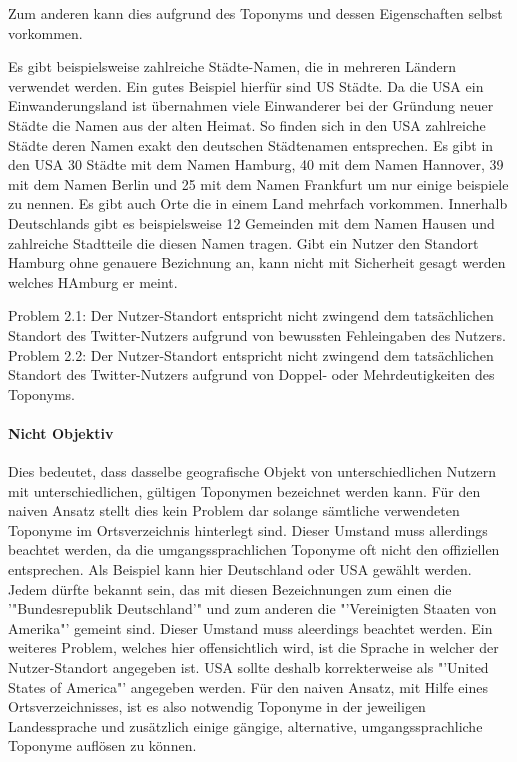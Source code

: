 				Zum anderen kann dies aufgrund des Toponyms und dessen Eigenschaften selbst vorkommen.

				Es gibt beispielsweise zahlreiche Städte-Namen, die in mehreren Ländern verwendet werden.
				Ein gutes Beispiel hierfür sind US Städte. 
				Da die USA ein Einwanderungsland ist übernahmen viele Einwanderer bei der Gründung neuer Städte die Namen aus der alten Heimat. 
				So finden sich in den USA zahlreiche Städte deren Namen exakt den deutschen Städtenamen entsprechen. 
				Es gibt in den USA 30 Städte mit dem Namen Hamburg, 40 mit dem Namen Hannover, 39 mit dem Namen Berlin und 25 mit dem Namen Frankfurt um nur einige beispiele zu nennen.
				Es gibt auch Orte die in einem Land mehrfach vorkommen.
				Innerhalb Deutschlands gibt es beispielsweise 12 Gemeinden mit dem Namen Hausen und zahlreiche Stadtteile die diesen Namen tragen.  
				Gibt ein Nutzer den Standort Hamburg ohne genauere Bezichnung an, kann nicht mit Sicherheit gesagt werden welches HAmburg er meint. 

				Problem 2.1: Der Nutzer-Standort entspricht nicht zwingend dem tatsächlichen Standort des Twitter-Nutzers aufgrund von bewussten Fehleingaben des Nutzers.
				Problem 2.2: Der Nutzer-Standort entspricht nicht zwingend dem tatsächlichen Standort des Twitter-Nutzers aufgrund von Doppel- oder Mehrdeutigkeiten des Toponyms.


			\paragraph{Nicht Objektiv} 

				Dies bedeutet, dass dasselbe geografische Objekt von unterschiedlichen Nutzern mit unterschiedlichen, gültigen Toponymen bezeichnet werden kann.
				Für den naiven Ansatz stellt dies kein Problem dar solange sämtliche verwendeten Toponyme im Ortsverzeichnis hinterlegt sind.  
				Dieser Umstand muss allerdings beachtet werden, da die umgangssprachlichen Toponyme oft nicht den offiziellen entsprechen. 
				Als Beispiel kann hier Deutschland oder USA gewählt werden. 
				Jedem dürfte bekannt sein, das mit diesen Bezeichnungen zum einen die '"Bundesrepublik Deutschland'" und zum anderen die "'Vereinigten Staaten von Amerika"' gemeint sind. 
				Dieser Umstand muss aleerdings beachtet werden.
				Ein weiteres Problem, welches hier offensichtlich wird, ist die Sprache in welcher der Nutzer-Standort angegeben ist. 
				USA sollte deshalb korrekterweise als "'United States of America"' angegeben werden.
				Für den naiven Ansatz, mit Hilfe eines Ortsverzeichnisses, ist es also notwendig Toponyme in der jeweiligen Landessprache und zusätzlich einige gängige, alternative, umgangssprachliche Toponyme auflösen zu können.  

